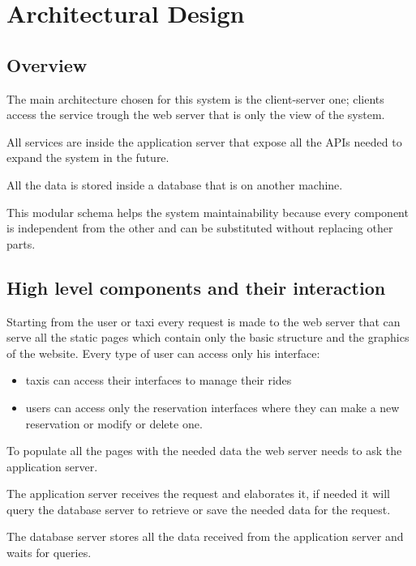 \section{Architectural Design}
\subsection{Overview}
	The main architecture chosen for this system is the client-server one; clients access the service trough the web server that is only the view of the system. 
	
	All services are inside the application server that expose all the APIs needed to expand the system in the future.
	
	All the data is stored inside a database that is on another machine.

	This modular schema helps the system maintainability because every component is independent from the other and can be substituted without replacing other parts. 
\subsection{High level components and their interaction}
	Starting from the user or taxi every request is made to the web server that can serve all the static pages which contain only the basic structure and the graphics of the website. Every type of user can access only his interface:
	\begin{itemize} 
		\item taxis can access their interfaces to manage their rides 
		\item users can access only the reservation interfaces where they can make a new reservation or modify or delete one.
	\end{itemize}
	To populate all the pages with the needed data the web server needs to ask the application server.
	
	The application server receives the request and elaborates it, if needed it will query the database server to retrieve or save the needed data for the request.
	
	The database server stores all the data received from the application server and waits for queries.
